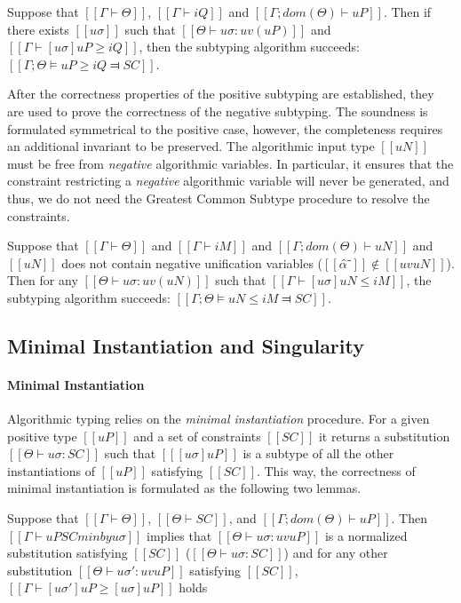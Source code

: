 \begin{lemma*}
    Suppose that $[[Γ ⊢ Θ]]$, $[[Γ ⊢ iQ]]$ and $[[Γ ; dom(Θ) ⊢  uP]]$.
    Then if there exists $[[uσ]]$ such that $[[Θ ⊢ uσ : uv(uP)]]$ and $[[ Γ ⊢ [uσ]uP ≥ iQ ]]$,
    then the subtyping algorithm succeeds: $[[Γ; Θ ⊨ uP ≥ iQ ⫤ SC]]$.
\end{lemma*}


After the correctness properties of the positive subtyping are established,
they are used to prove the correctness of the negative subtyping.
The soundness is formulated symmetrical to the positive case,
however, the completeness requires an additional invariant to be preserved.
The algorithmic input type $[[uN]]$ must be free from \emph{negative} algorithmic variables.
In particular, it ensures that the constraint restricting a \emph{negative} algorithmic
variable will never be generated, and thus, we do not need the 
Greatest Common Subtype procedure to resolve the constraints.

\begin{lemma*}
    Suppose that $[[Γ ⊢ Θ]]$ and $[[Γ ⊢ iM]]$ and $[[Γ ; dom(Θ) ⊢ uN]]$
    and $[[uN]]$ does not contain negative unification variables ($[[α̂⁻]] \notin [[uv uN]]$).
    Then for any $[[Θ ⊢ uσ : uv(uN)]]$ such that $[[Γ ⊢ [uσ]uN ≤ iM]]$,
    the subtyping algorithm succeeds: $[[Γ ; Θ ⊨ uN ≤ iM ⫤ SC]]$.
\end{lemma*}

\subsection{Minimal Instantiation and Singularity}
\label{sec:singularity-proof}

\paragraph{Minimal Instantiation}
Algorithmic typing relies on the \emph{minimal instantiation} procedure.
For a given positive type $[[uP]]$ and a set of constraints $[[SC]]$
it returns a substitution $[[Θ ⊢ uσ : SC]]$ such that
$[[ [uσ]uP ]]$ is a subtype of all the other instantiations of $[[uP]]$ satisfying $[[SC]]$.
This way, the correctness of minimal instantiation is formulated as the following two lemmas.

\begin{lemma*}
    Suppose that $[[Γ ⊢ Θ]]$, $[[Θ ⊢ SC]]$, and $[[Γ; dom(Θ) ⊢ uP]]$.
    Then $[[Γ ⊢ uP SC minby uσ ]]$ implies that 
    $[[Θ ⊢ uσ : uv uP]]$ is a normalized substitution satisfying $[[SC]]$
    (\ie $[[Θ ⊢ uσ : SC]]$)
    and for any other substitution $[[Θ ⊢ uσ' : uv uP ]]$ satisfying $[[SC]]$,
    $[[Γ ⊢ [uσ']uP ≥ [uσ]uP ]]$ holds
\end{lemma*}

